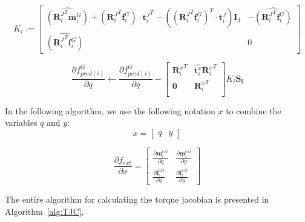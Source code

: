 \begin{equation}
  K_i :=
  \begin{bmatrix}
    \widehat{({\mathbf{R}_i^J}^T \mathbf{m}^{G}_i)}
    + \left({\mathbf{R}_i^J}^T \mathbf{f}^{G}_i\right) \cdot {\mathbf{t}^J_i}^T
    - \left( {({\mathbf{R}_i^J}^T \mathbf{f}^{G}_i)}^T \cdot \mathbf{t}^J_i\right) \mathbf{I}_3
    & -\widehat{({\mathbf{R}_i^J}^T \mathbf{f}^{G}_i)} \\
    \widehat{({\mathbf{R}_i^J}^T \mathbf{f}^{G}_i)} & 0
  \end{bmatrix}
\end{equation}

\begin{equation}
    \frac{\partial f^G_{pred(i)}}{\partial q} \leftarrow \frac{\partial f^G_{pred(i)}}{\partial q} -
  \begin{bmatrix}
    {\mathbf{R}^{x}_i}^T & \widehat{\mathbf{t}^{x}_i}{\mathbf{R}^{x}_i}^T \\
    \mathbf{0} & {\mathbf{R}^{x}_i}^T \\
  \end{bmatrix}
  K_i \mathbf{S_i}
\end{equation}

In the following algorithm, we use the following notation $x$ to combine the variables $q$ and $y$:
\begin{equation}
  x = \begin{bmatrix}
    q & y
  \end{bmatrix}
\end{equation}

\begin{equation}
  \frac{\partial f_{ext}}{\partial x} =
  \begin{bmatrix}
    \frac{\partial \mathbf{m}^{ext}_i}{\partial q} & \frac{\partial \mathbf{m}^{ext}_i}{\partial y}
    \\
    \frac{\partial \mathbf{f}^{ext}_i}{\partial q} & \frac{\partial \mathbf{f}^{ext}_i}{\partial y}
  \end{bmatrix}
\end{equation}


The entire algorithm for calculating the torque jacobian is presented in Algorithm~\ref{alg:TJC}.

